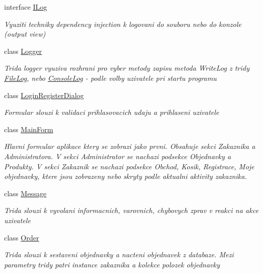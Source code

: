 \begin{DoxyCompactItemize}
interface \mbox{\hyperlink{interface_eshop_1_1_i_log}{I\+Log}}
\begin{DoxyCompactList}\small\item\em Vyuziti techniky dependency injection k logovani do souboru nebo do konzole (output view) \end{DoxyCompactList}\item 
class \mbox{\hyperlink{class_eshop_1_1_logger}{Logger}}
\begin{DoxyCompactList}\small\item\em Trida logger vyuziva rozhrani pro vyber metody zapisu metoda Write\+Log z tridy \mbox{\hyperlink{class_eshop_1_1_file_log}{File\+Log}}, nebo \mbox{\hyperlink{class_eshop_1_1_console_log}{Console\+Log}} -\/ podle volby uzivatele pri startu programu \end{DoxyCompactList}\item 
class \mbox{\hyperlink{class_eshop_1_1_login_register_dialog}{Login\+Register\+Dialog}}
\begin{DoxyCompactList}\small\item\em Formular slouzi k validaci prihlasovacich udaju a prihlaseni uzivatele \end{DoxyCompactList}\item 
class \mbox{\hyperlink{class_eshop_1_1_main_form}{Main\+Form}}
\begin{DoxyCompactList}\small\item\em Hlavni formular aplikace ktery se zobrazi jako prvni. Obsahuje sekci Zakaznika a Administratora. V sekci Administrator se nachazi podsekce Objednavky a Produkty. V sekci Zakaznik se nachazi podsekce Obchod, Kosik, Registrace, Moje objednavky, ktere jsou zobrazeny nebo skryty podle aktualni aktivity zakaznika. \end{DoxyCompactList}\item 
class \mbox{\hyperlink{class_eshop_1_1_message}{Message}}
\begin{DoxyCompactList}\small\item\em Trida slouzi k vyvolani informacnich, varovnich, chybovych zprav v reakci na akce uzivatele \end{DoxyCompactList}\item 
class \mbox{\hyperlink{class_eshop_1_1_order}{Order}}
\begin{DoxyCompactList}\small\item\em Trida slouzi k sestaveni objednavky a nacteni objednavek z databaze. Mezi parametry tridy patri instance zakaznika a kolekce polozek objednavky \end{DoxyCompactList}\item 

\end{DoxyCompactItemize}
